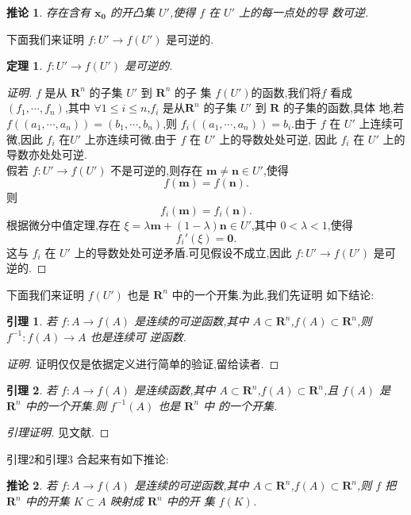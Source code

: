 \documentclass[twoside,11pt]{article}
\newtheorem{theorem}{定理}
\newtheorem{lemma}{引理}
\newtheorem{corollary}{推论}
\begin{document}
\begin{corollary}
  存在含有 $\mathbf{x_0}$ 的开凸集 $U'$,使得 $f$ 在 $U'$ 上的每一点处的导
  数可逆.
\end{corollary}
\bigskip
下面我们来证明 $f:U'\to f(U')$ 是可逆的.
\begin{theorem}
  $f:U'\to f(U')$ 是可逆的.
\end{theorem}
\begin{proof}[证明]
  $f$ 是从 $\mathbf{R}^n$ 的子集 $U'$ 到 $\mathbf{R}^n$ 的子
  集 $f(U')$的函数,我们将$f$ 看成 $(f_1,\cdots,f_n)$,其中 $\forall
  1\leq i\leq n$,$f_i$ 是从$\mathbf{R}^n$ 的子集 $U'$ 到 $\mathbf{R}$
  的子集的函数,具体
  地,若$f((a_1,\cdots,a_n))=(b_1,\cdots,b_n)$,则
  $f_i((a_1,\cdots,a_n))=b_i$.由于 $f$ 在 $U'$ 上连续可
  微,因此 $f_i$ 在$U'$ 上亦连续可微.由于 $f$ 在 $U'$ 上的导数处处可逆,
  因此 $f_i$ 在 $U'$ 上的导数亦处处可逆.\\

假若 $f:U'\to f(U')$ 不是可逆的,则存在 $\mathbf{m}\neq \mathbf{n}\in
U'$,使得
$$
f(\mathbf{m})=f(\mathbf{n}).
$$
则
$$
f_i(\mathbf{m})=f_i(\mathbf{n}).
$$
根据微分中值定理,存在 $\xi=
\lambda\mathbf{m}+(1-\lambda)\mathbf{n}\in U'$,其中 $0<\lambda<1$,使得
$$
f_i'(\xi)=\mathbf{0}.
$$
这与 $f_i$ 在 $U'$ 上的导数处处可逆矛盾.可见假设不成立,因此 $f:U'\to f(U')$ 是可逆的.
\end{proof}
\bigskip
下面我们来证明 $f(U')$ 也是 $\mathbf{R}^n$ 中的一个开集.为此,我们先证明
如下结论:
\begin{lemma}
  若 $f:A\to f(A)$ 是连续的可逆函数,其中 $A\subset \mathbf{R}^n$,$f(A)\subset
  \mathbf{R}^n$,则 $f^{-1}:f(A)\to A$ 也是连续可
  逆函数.
\end{lemma}
\begin{proof}[证明]
  证明仅仅是依据定义进行简单的验证,留给读者.
\end{proof}

\begin{lemma}
  若 $f:A\to f(A)$ 是连续函数,其中 $A\subset \mathbf{R}^n$,$f(A)\subset
  \mathbf{R}^n$,且  $f(A)$ 是 $\mathbf{R}^n$ 中的一个开集.则
  $f^{-1}(A)$ 也是 $\mathbf{R}^{n}$ 中
  的一个开集.
\end{lemma}
\begin{proof}[引理证明]
  见文献\cite{spivak}.
\end{proof}
引理2和引理3 合起来有如下推论:
\begin{corollary}
  若 $f:A\to f(A)$ 是连续的可逆函数,其中 $A\subset \mathbf{R}^n$,$f(A)\subset
  \mathbf{R}^n$,则 $f$ 把 $\mathbf{R}^n$ 中的开集
  $K\subset A$ 映射成 $\mathbf{R}^n$ 中的开
  集 $f(K)$.
\end{corollary}
\end{document}
